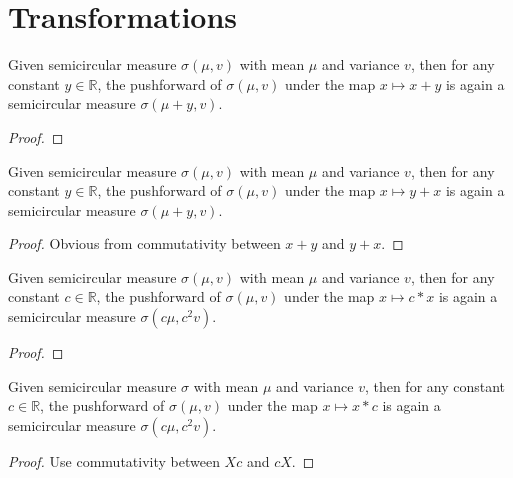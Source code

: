 

\section{Transformations}

\begin{lemma}
  \label{lem:semicircleReal_map_add_const}
  \notready
  Given semicircular measure $\sigma(\mu, v)$ with mean $\mu$ and variance $v$, then for any constant $y \in \mathbb{R}$, the pushforward
  of $\sigma(\mu, v)$ under the map $x \mapsto x + y$ is again a semicircular measure $\sigma(\mu + y, v)$. 
  \begin{proof}
  \end{proof}
\end{lemma}


\begin{lemma}
  \label{lem:semicircleReal_map_const_add}
  \leanok
  Given semicircular measure $\sigma(\mu, v)$ with mean $\mu$ and variance $v$, then for any constant $y \in \mathbb{R}$, the pushforward
  of $\sigma(\mu, v)$ under the map $x \mapsto y + x$ is again a semicircular measure $\sigma(\mu + y, v)$. 
  \begin{proof}
    Obvious from commutativity between $x + y$ and $y + x$.
  \end{proof}
\end{lemma}


\begin{lemma}
  \label{lem:semicircleReal_map_const_mul}
  \notready
    Given semicircular measure $\sigma(\mu, v)$ with mean $\mu$ and variance $v$, then for any constant $c \in \mathbb{R}$, the pushforward
  of $\sigma(\mu, v)$ under the map $x \mapsto c * x$ is again a semicircular measure $\sigma(c\mu, c^2v)$. 
  \begin{proof}
  \end{proof}
\end{lemma}



\begin{lemma}
  \label{lem:semicircleReal_map_mul_const}
  \leanok
   Given semicircular measure $\sigma$ with mean $\mu$ and variance $v$, then for any constant $c \in \mathbb{R}$, the pushforward
  of $\sigma(\mu, v)$ under the map $x \mapsto x * c$ is again a semicircular measure $\sigma(c\mu, c^2v)$. 
  \begin{proof}
    Use commutativity between $Xc$ and $cX$.
  \end{proof}
\end{lemma}



